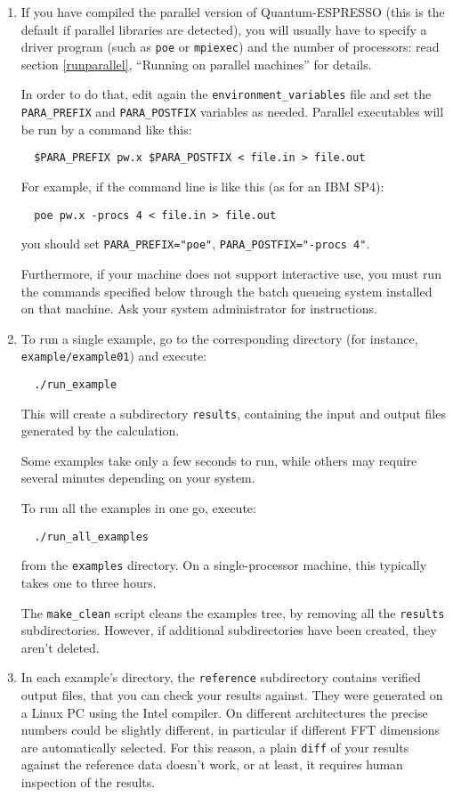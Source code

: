 \documentclass[12pt,a4paper]{article}
\begin{document}
\begin{enumerate}
  \item
If you have compiled the parallel version of Quantum-ESPRESSO (this
is the default if parallel libraries are detected), you will usually 
have to specify a driver program (such as
\texttt{poe} or \texttt{mpiexec}) and the number of processors: read
section \ref{runparallel}, ``Running on parallel machines'' for
details.

In order to do that, edit again the \texttt{environment\_variables}
file and set the \texttt{PARA\_PREFIX} and \texttt{PARA\_POSTFIX}
variables as needed.
Parallel executables will be run by a command like this:
\begin{verbatim}
  $PARA_PREFIX pw.x $PARA_POSTFIX < file.in > file.out
\end{verbatim}

For example, if the command line is like this (as for an IBM SP4):
\begin{verbatim}
  poe pw.x -procs 4 < file.in > file.out
\end{verbatim}
you should set \texttt{PARA\_PREFIX="poe"},
\texttt{PARA\_POSTFIX="-procs 4"}.

Furthermore, if your machine does not support interactive use, you
must run the commands specified below through the batch queueing
system installed on that machine.
Ask your system administrator for instructions.

  \item
To run a single example, go to the corresponding directory (for
instance, \texttt{example/example01}) and execute:
\begin{verbatim}
  ./run_example
\end{verbatim}
This will create a subdirectory \texttt{results}, containing the input
and output files generated by the calculation.

Some examples take only a few seconds to run, while others may require
several minutes depending on your system.

To run all the examples in one go, execute:
\begin{verbatim}
  ./run_all_examples
\end{verbatim}
from the \texttt{examples} directory.
On a single-processor machine, this typically takes one to three
hours.

The \texttt{make\_clean} script cleans the examples tree, by removing
all the \texttt{results} subdirectories.  However, if additional
subdirectories have been created, they aren't deleted.

  \item
In each example's directory, the \texttt{reference} subdirectory
contains verified output files, that you can check your results
against.
They were generated on a Linux PC using the Intel compiler.
On different architectures the precise numbers could be slightly
different, in particular if different FFT dimensions are automatically
selected.  For this reason, a plain \texttt{diff} of your results
against the reference data doesn't work, or at least, it requires
human inspection of the results.


\end{enumerate}
\end{document}
